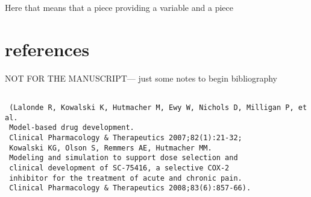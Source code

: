 \documentclass[12pt]{amsart}
\begin{document}
Here that means that a piece providing a variable
and a piece 


\section{references}
NOT FOR THE MANUSCRIPT--- just some notes to begin bibliography
\begin{verbatim}

 (Lalonde R, Kowalski K, Hutmacher M, Ewy W, Nichols D, Milligan P, et al. 
 Model-based drug development. 
 Clinical Pharmacology & Therapeutics 2007;82(1):21-32; 
 Kowalski KG, Olson S, Remmers AE, Hutmacher MM. 
 Modeling and simulation to support dose selection and 
 clinical development of SC-75416, a selective COX-2 
 inhibitor for the treatment of acute and chronic pain. 
 Clinical Pharmacology & Therapeutics 2008;83(6):857-66). 
\end{verbatim} 
\end{document}
